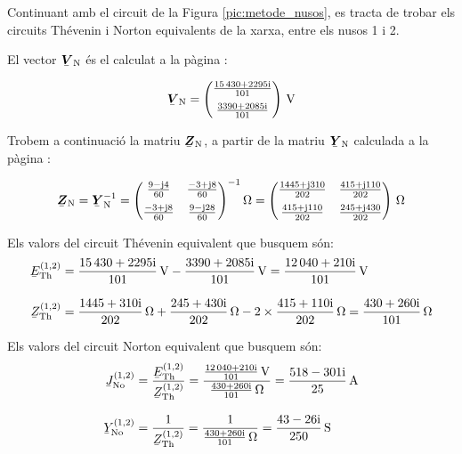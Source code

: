 \begin{exemple}
    Continuant amb el circuit de la Figura \vref{pic:metode_nusos}, es
    tracta de trobar els circuits Thévenin i Norton equivalents de la
    xarxa, entre els nusos 1 i 2.

    El vector $\mcmplx{V}\ped{N}$ és el calculat a la pàgina \pageref{eq:vn_exemp}:

    \[
      \mcmplx{V}\ped{N} =
      \begin{pmatrix}
            \frac{\complexnum{15430 + j 2295}}{101} \\[2mm]
            \frac{\complexnum{3390 + j 2085}}{101}
      \end{pmatrix}\,\unit{V}
   \]

    Trobem a continuació la matriu $\mcmplx{Z}\ped{N}$, a partir de la matriu $\mcmplx{Y}\ped{N}$
    calculada a la pàgina \pageref{eq:yn}:

    \[
       \mcmplx{Z}\ped{N} =  \mcmplx{Y}\ped{N}^{-1} =
       \begin{pmatrix}
                \frac{9 - \ju 4}{60} & \frac{-3 + \ju 8}{60} \\[2mm]
                \frac{-3 + \ju 8}{60} & \frac{9 - \ju 28}{60}
          \end{pmatrix} ^{-1}\unit{\ohm} =
       \begin{pmatrix}
             \frac{1445 + \ju 310}{202} & \frac{415 + \ju 110}{202} \\[2mm]
             \frac{415 + \ju 110}{202} & \frac{245 + \ju 430}{202}
       \end{pmatrix}\,\unit{\ohm}
    \]

    Els valors del circuit Thévenin equivalent que busquem són:
    \begin{align*}
       \cmplx{E}\ped{Th}^{(1,2)} &= \frac{\complexnum{15430+j2295}}{101}\,\unit{V} - \frac{\complexnum{3390+j2085}}{101}\,\unit{V} =
       \frac{\complexnum{12040+j210}}{101}\,\unit{V} \\[2ex]
       \cmplx{Z}\ped{Th}^{(1,2)} &= \frac{\complexnum{1445+j310}}{202}\,\unit{\ohm} + \frac{\complexnum{245+j430}}{202}\,\unit{\ohm} -
       2\times\frac{\complexnum{415+j110}}{202}\,\unit{\ohm} = \frac{\complexnum{430+j260}}{101}\,\unit{\ohm}
    \end{align*}

    Els valors del circuit Norton equivalent que busquem són:
    \begin{align*}
       \cmplx{J}\ped{No}^{(1,2)} &= \frac{\cmplx{E}\ped{Th}^{(1,2)}}{\cmplx{Z}\ped{Th}^{(1,2)}} =
       \frac{\frac{\complexnum{12040+j210}}{101}\,\unit{V}}{\frac{\complexnum{430+j260}}{101}\,\unit{\ohm}} =
       \frac{\complexnum{518-j301}}{25}\,\unit{A} \\[2ex]
       \cmplx{Y}\ped{No}^{(1,2)} &= \frac{1}{\cmplx{Z}\ped{Th}^{(1,2)}} =
       \frac{1}{\frac{\complexnum{430+j260}}{101}\,\unit{\ohm}} = \frac{\complexnum{43-j26}}{250}\,\unit{S}
    \end{align*}

\end{exemple}
